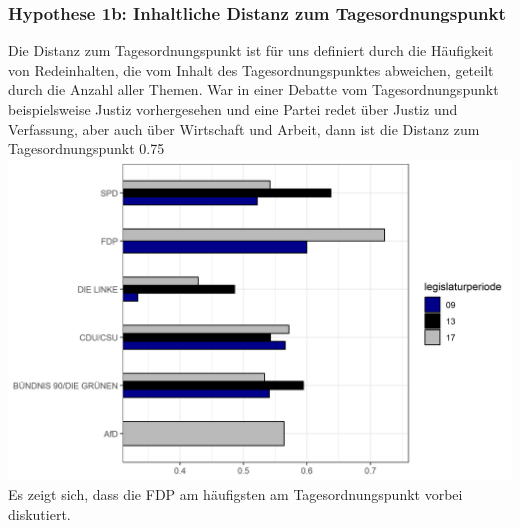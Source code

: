 \subsubsection{Hypothese 1b: Inhaltliche Distanz zum Tagesordnungspunkt}

Die Distanz zum Tagesordnungspunkt ist für uns definiert durch die Häufigkeit von Redeinhalten, die vom Inhalt des Tagesordnungspunktes abweichen, geteilt durch die Anzahl aller Themen. War in einer Debatte vom Tagesordnungspunkt beispielsweise Justiz vorhergesehen und eine Partei redet über Justiz und Verfassung, aber auch über Wirtschaft und Arbeit, dann ist die Distanz zum Tagesordnungspunkt 0.75 \\

\includegraphics[width=\linewidth]{Grafiken/distop.png}\\

Es zeigt sich, dass die FDP am häufigsten am Tagesordnungspunkt vorbei diskutiert. 



